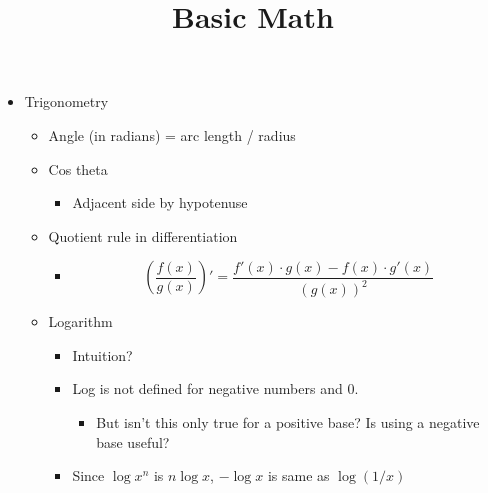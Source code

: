 \documentclass{../template/texnote}
\title{Basic Math}
\begin{document}
    \maketitle {}
\begin{itemize}
	\item Trigonometry
		\begin{itemize}
			\item Angle (in radians) = arc length / radius
			\item Cos theta
				\begin{itemize}
					\item Adjacent side by hypotenuse
				\end{itemize}
			\item Quotient rule in differentiation
				\begin{itemize}
					\item $$\left(\frac{f(x)}{g(x)}\right)' = \frac{f'(x) \cdot g(x) - f(x) \cdot g'(x)}{(g(x))^2}$$
				\end{itemize}
			\item Logarithm
				\begin{itemize}
					\item Intuition?
					\item Log is not defined for negative numbers and 0.
						\begin{itemize}
							\item But isn't this only true for a positive base? Is using a negative base useful?
			\end{itemize}

					\item Since $\log x^n$ is $n \log x$, $- \log x$ is same as $\log (1/x)$
				\end{itemize}

		\end{itemize}
\end{itemize}
    \printbibliography
\end{document}
